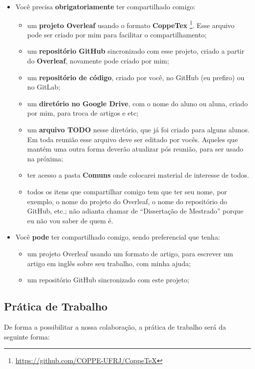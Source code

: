 \documentclass{article}
\begin{document}
\begin{itemize}
    \item Você precisa \textbf{obrigatoriamente} ter compartilhado comigo:
    \begin{itemize}
        \item um \textbf{projeto Overleaf} usando o formato \textbf{CoppeTex} \footnote{\url{https://github.com/COPPE-UFRJ/CoppeTeX}}. Esse arquivo pode ser criado por mim para facilitar o compartilhamento;
        \item um \textbf{repositório GitHub} sincronizado com esse projeto, criado a partir do \textbf{Overleaf}, novamente pode criado por mim;
        \item um \textbf{repositório de código}, criado por você, no GitHub (eu prefiro) ou no GitLab;
        \item um \textbf{diretório no Google Drive}, com o nome do aluno ou aluna, criado por mim, para troca de artigos e etc;
        \item um \textbf{arquivo TODO} nesse diretório, que já foi criado para alguns alunos. Em toda reunião esse arquivo deve ser editado por vocês. Aqueles que mantém uma outra forma deverão atualizar pós reunião, para ser usado na próxima;
        \item ter acesso a pasta \textbf{Comuns} onde colocarei material de interesse de todos.
        \item todos os itens que compartilhar comigo tem que ter seu nome, por exemplo, o nome do projeto do Overleaf, o nome do repositório do GitHub, etc.; não adianta chamar de ``Dissertação de Mestrado'' porque eu não vou saber de quem é.
    \end{itemize}
    \item Você \textbf{pode} ter compartilhado comigo, sendo preferencial que tenha:
    \begin{itemize}
        \item um projeto Overleaf usando um formato de artigo, para escrever um artigo em inglês sobre seu trabalho, com minha ajuda;
        \item um repositório GitHub sincronizado com este projeto;
    \end{itemize}
\end{itemize}


\subsection{Prática de Trabalho}

De forma a possibilitar a nossa colaboração, a prática de trabalho será da seguinte forma:
\end{document}
